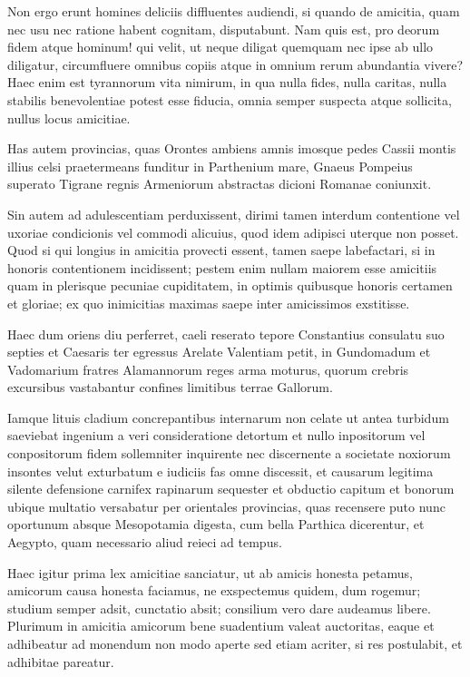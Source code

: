 \documentclass[12pt]{book}
\begin{document}
Non ergo erunt homines deliciis diffluentes audiendi, si quando de amicitia, quam nec usu nec ratione habent cognitam, disputabunt. Nam quis est, pro deorum fidem atque hominum! qui velit, ut neque diligat quemquam nec ipse ab ullo diligatur, circumfluere omnibus copiis atque in omnium rerum abundantia vivere? Haec enim est tyrannorum vita nimirum, in qua nulla fides, nulla caritas, nulla stabilis benevolentiae potest esse fiducia, omnia semper suspecta atque sollicita, nullus locus amicitiae.

Has autem provincias, quas Orontes ambiens amnis imosque pedes Cassii montis illius celsi praetermeans funditur in Parthenium mare, Gnaeus Pompeius superato Tigrane regnis Armeniorum abstractas dicioni Romanae coniunxit.

Sin autem ad adulescentiam perduxissent, dirimi tamen interdum contentione vel uxoriae condicionis vel commodi alicuius, quod idem adipisci uterque non posset. Quod si qui longius in amicitia provecti essent, tamen saepe labefactari, si in honoris contentionem incidissent; pestem enim nullam maiorem esse amicitiis quam in plerisque pecuniae cupiditatem, in optimis quibusque honoris certamen et gloriae; ex quo inimicitias maximas saepe inter amicissimos exstitisse.

Haec dum oriens diu perferret, caeli reserato tepore Constantius consulatu suo septies et Caesaris ter egressus Arelate Valentiam petit, in Gundomadum et Vadomarium fratres Alamannorum reges arma moturus, quorum crebris excursibus vastabantur confines limitibus terrae Gallorum.

Iamque lituis cladium concrepantibus internarum non celate ut antea turbidum saeviebat ingenium a veri consideratione detortum et nullo inpositorum vel conpositorum fidem sollemniter inquirente nec discernente a societate noxiorum insontes velut exturbatum e iudiciis fas omne discessit, et causarum legitima silente defensione carnifex rapinarum sequester et obductio capitum et bonorum ubique multatio versabatur per orientales provincias, quas recensere puto nunc oportunum absque Mesopotamia digesta, cum bella Parthica dicerentur, et Aegypto, quam necessario aliud reieci ad tempus.

Haec igitur prima lex amicitiae sanciatur, ut ab amicis honesta petamus, amicorum causa honesta faciamus, ne exspectemus quidem, dum rogemur; studium semper adsit, cunctatio absit; consilium vero dare audeamus libere. Plurimum in amicitia amicorum bene suadentium valeat auctoritas, eaque et adhibeatur ad monendum non modo aperte sed etiam acriter, si res postulabit, et adhibitae pareatur.
\end{document}
